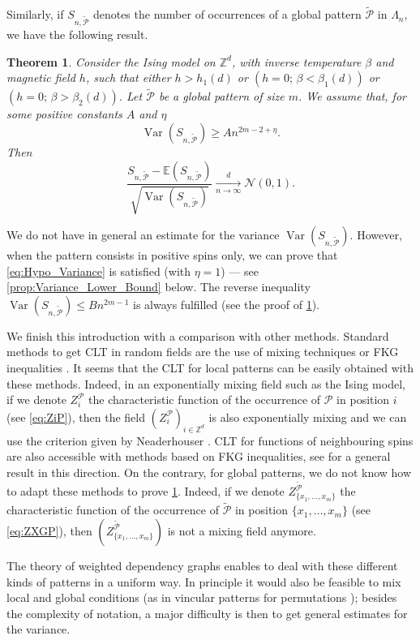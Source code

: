 \documentclass{amsart}
\newcommand{\field}[1]{\mathbb{#1}}
\newcommand{\Z}{\field{Z}}
\def\GP{\mathcal{\tilde{P}}}
\DeclareMathOperator\Var{Var}
\numberwithin{equation}{section}
\newtheorem{theorem}{Theorem}[section]
\theoremstyle{remark}
\begin{document}
Similarly, if $S_{n,\GP}$ denotes the number of occurrences of a global pattern $\GP$ in $\Lambda_n$,
we have the following result.
\begin{theorem}
  \label{thm:GlobalPatterns}
Consider the Ising model on $\Z^d$, with inverse temperature $\beta$ and magnetic field $h$, such that either $h > h_1(d)$ or $(h=0;\, \beta < \beta_1(d))$ or $(h=0;\, \beta > \beta_2(d))$. Let $\GP$ be a global pattern of size $m$.
We assume that, for some positive constants $A$ and $\eta$
\begin{equation}
  \Var(S_{n,\GP}) \ge A n^{2m-2+\eta}.
  \label{eq:Hypo_Variance}
\end{equation}
Then
\[\frac{S_{n,\GP} - \mathbb{E}(S_{n,\GP}) }{\sqrt{\Var(S_{n,\GP})}} \xrightarrow[n\to\infty]{d} \mathcal{N}(0, 1).\]
\end{theorem}
We do not have in general an estimate for the variance $\Var(S_{n,\GP})$.
However, when the pattern consists in positive spins only,
we can prove that \eqref{eq:Hypo_Variance} is satisfied (with $\eta=1$)
--- see \cref{prop:Variance_Lower_Bound} below.
The reverse inequality $\Var(S_{n,\GP}) \le B n^{2m-1}$ is always fulfilled
(see the proof of \cref{thm:GlobalPatterns}).
\medskip

We finish this introduction with a comparison with other methods.
Standard methods to get CLT in random fields are the use of mixing techniques \cite{neaderhouser1978}
or FKG inequalities \cite{Newman80,Newman83}.
It seems that the CLT for local patterns can be easily obtained with these methods.
Indeed, in an exponentially mixing field such as the Ising model,
if we denote $Z^{\mathcal P}_i$ the characteristic function of the occurrence
of $\mathcal P$ in position $i$ (see \eqref{eq:ZiP}),
then the field $(Z^{\mathcal P}_i)_{i \in \Z^d}$ is also exponentially mixing
and we can use the criterion given by Neaderhouser \cite[Section 3]{neaderhouser1978}.
CLT for functions of neighbouring spins are also accessible with methods based on FKG inequalities,
see \cite{Newman83} for a general result in this direction.
On the contrary, for global patterns, we do not know how to adapt these methods
to prove \cref{thm:GlobalPatterns}.
Indeed, if we denote $Z^{\GP}_{\{x_1,\dots,x_m\}}$ the characteristic function
of the occurrence of $\GP$ in position $\{x_1,\dots,x_m\}$ (see \eqref{eq:ZXGP}),
then $(Z^{\GP}_{\{x_1,\dots,x_m\}})$ is not a mixing field anymore.

The theory of weighted dependency graphs enables to deal with these different kinds of patterns in a
uniform way. In principle it would also be feasible to mix local and global conditions (as in vincular patterns for permutations \cite{Lisa});
besides the complexity of notation, a major difficulty is then to get
general estimates for the variance.
\end{document}
